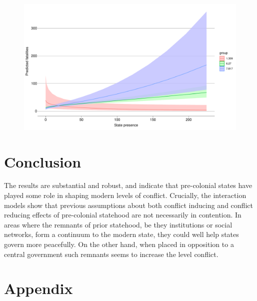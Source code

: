 \documentclass[12pt]{article}
\begin{document}


\begin{figure}[htpb]
	\centering
	\includegraphics[width=\linewidth]{"../R/Output/deathsIntPlot.pdf"}
	\caption{}
	\label{deaths_int}
\end{figure}



\section{Conclusion}

The results are substantial  and robust, and indicate that pre-colonial states
have played some role in shaping modern levels of conflict. Crucially, the
interaction models show that previous assumptions about both conflict inducing
and conflict reducing effects of pre-colonial statehood are not necessarily in
contention. In areas where the remnants of prior statehood, be they institutions
or social networks, form a continuum to the modern state, they could well help
states govern more peacefully. On the other hand, when placed in opposition to a
central government such remnants seems to increase the level conflict.


\pagebreak




\pagebreak
\section*{Appendix}


%

\end{document}

